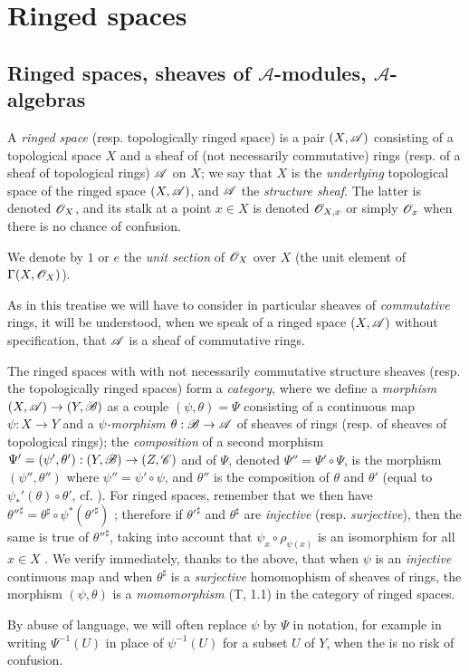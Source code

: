 \section{Ringed spaces}
\label{section:0.4}

\subsection{Ringed spaces, sheaves of $\mathcal{A}$-modules, $\mathcal{A}$-algebras}
\label{subsection:0.4.1}

\begin{env}[4.1.1]
\label{0.4.1.1}
A \emph{ringed space} (resp. topologically ringed space) is a pair $(X,\mathscr{A})$
consisting of a topological space $X$ and a sheaf of (not necessarily
commutative) rings (resp. of a sheaf of topological rings) $\mathscr{A}$ on $X$; we
say that $X$ is the \emph{underlying} topological space of the ringed space
$(X,\mathscr{A})$, and $\mathscr{A}$ the \emph{structure sheaf}. The latter is denoted
$\mathscr{O}_X$, and its stalk at a point $x\in X$ is denoted $\mathscr{O}_{X,x}$ or simply
$\mathscr{O}_x$ when there is no chance of confusion.

We denote by $1$ or $e$ the \emph{unit section} of $\mathscr{O}_X$ over $X$ (the unit
element of $\Gamma(X,\mathscr{O}_X)$).

As in this treatise we will have to consider in particular sheaves of
\emph{commutative} rings, it will be understood, when we speak of a ringed space
$(X,\mathscr{A})$ without specification, that $\mathscr{A}$ is a sheaf of commutative
rings.

The ringed spaces with with not necessarily commutative structure sheaves
(resp. the topologically ringed spaces) form a \emph{category}, where we define
a \emph{morphism} $(X,\sh{A})\to(Y,\sh{B})$ as a couple $(\psi,\theta)=\Psi$
consisting of a continuous map $\psi:X\to Y$ and a \emph{$\psi$-morphism}
$\theta:\sh{B}\to\sh{A}$  of sheaves of rings (resp. of sheaves
of topological rings); the \emph{composition} of a second morphism
$\Psi'=(\psi',\theta'):(Y,\sh{B})\to(Z,\sh{C})$ and of $\Psi$, denoted
$\Psi''=\Psi'\circ\Psi$, is the morphism $(\psi'',\theta'')$ where
$\psi''=\psi'\circ\psi$, and $\theta''$ is the composition of $\theta$ and
$\theta'$ (equal to $\psi_*'(\theta)\circ\theta'$, cf. ). For
ringed spaces, remember that we then have
${\theta''}^\sharp=\theta^\sharp\circ\psi^*({\theta'}^\sharp)$
; therefore if ${\theta'}^\sharp$ and $\theta^\sharp$ are
\emph{injective} (resp. \emph{surjective}), then the same is true of
${\theta''}^\sharp$, taking into account that $\psi_x\circ\rho_{\psi(x)}$ is an
isomorphism for all $x\in X$ . We verify immediately, thanks to
the above, that when $\psi$ is an \emph{injective} continuous map and when
$\theta^\sharp$ is a \emph{surjective} homomophism of sheaves of rings, the
morphism $(\psi,\theta)$ is a \emph{momomorphism} (T, 1.1) in the category of
ringed spaces.

By abuse of language, we will often replace $\psi$ by $\Psi$ in notation, for
example in writing $\Psi^{-1}(U)$ in place of $\psi^{-1}(U)$ for a subset $U$ of
$Y$, when the is no risk of confusion.
\end{env}

